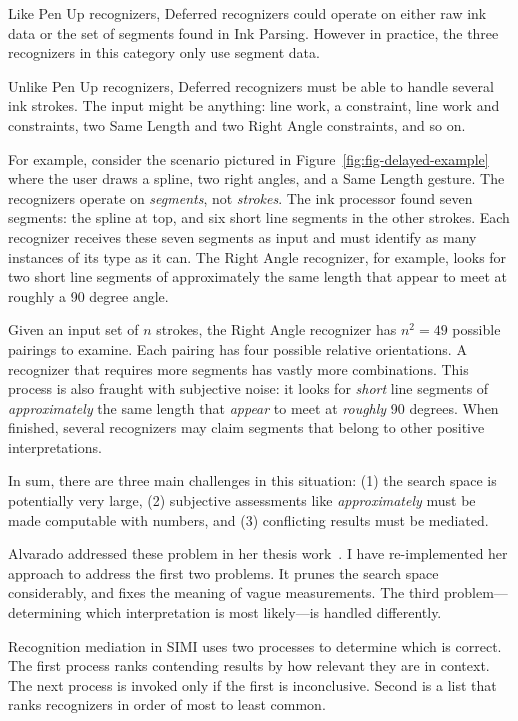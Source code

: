 Like Pen Up recognizers, Deferred recognizers could operate on either
raw ink data or the set of segments found in Ink Parsing. However in
practice, the three recognizers in this category only use segment
data.

Unlike Pen Up recognizers, Deferred recognizers must be able to handle
several ink strokes. The input might be anything: line work, a
constraint, line work and constraints, two Same Length and two Right
Angle constraints, and so on. 



For example, consider the scenario pictured in
Figure~\ref{fig:fig-delayed-example} where the user draws a spline,
two right angles, and a Same Length gesture. The recognizers operate
on \textit{segments}, not \textit{strokes}. The ink processor found
seven segments: the spline at top, and six short line segments in the
other strokes. Each recognizer receives these seven segments as input
and must identify as many instances of its type as it can. The Right
Angle recognizer, for example, looks for two short line segments of
approximately the same length that appear to meet at roughly a 90
degree angle. 

Given an input set of $n$ strokes, the Right Angle recognizer has
$n^2=49$ possible pairings to examine. Each pairing has four possible
relative orientations. A recognizer that requires more segments has
vastly more combinations. This process is also fraught with subjective
noise: it looks for \textit{short} line segments of
\textit{approximately} the same length that \textit{appear} to meet at
\textit{roughly} 90 degrees. When finished, several recognizers may
claim segments that belong to other positive interpretations.

In sum, there are three main challenges in this situation: (1) the
search space is potentially very large, (2) subjective assessments
like \textit{approximately} must be made computable with numbers, and
(3) conflicting results must be mediated.

Alvarado addressed these problem in her thesis
work~\cite[Ch. 4]{alvarado-phd-thesis}. I have re-implemented her
approach to address the first two problems. It prunes the search space
considerably, and fixes the meaning of vague measurements. The third
problem---determining which interpretation is most likely---is handled
differently.

Recognition mediation in SIMI uses two processes to determine which is
correct. The first process ranks contending results by how relevant
they are in context. The next process is invoked only if the first is
inconclusive. Second is a list that ranks recognizers in order of most
to least common.

